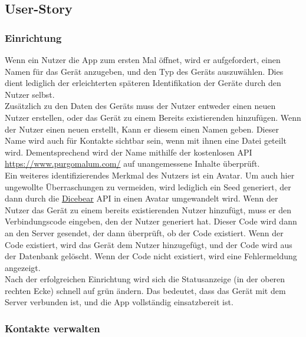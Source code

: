 \documentclass[a4paper]{article}
\begin{document}
\subsection{User-Story}

\subsubsection{Einrichtung}
Wenn ein Nutzer die App zum ersten Mal öffnet, wird er aufgefordert, einen Namen
für das Gerät anzugeben, und den Typ des Geräts auszuwählen. Dies dient
lediglich der erleichterten späteren Identifikation der Geräte durch den Nutzer
selbst.\\
Zusätzlich zu den Daten des Geräts muss der Nutzer entweder einen neuen Nutzer
erstellen, oder das Gerät zu einem Bereits existierenden hinzufügen. Wenn der
Nutzer einen neuen erstellt, Kann er diesem einen Namen geben. Dieser Name wird
auch für Kontakte sichtbar sein, wenn mit ihnen eine Datei geteilt wird.
Dementsprechend wird der Name mithilfe der kostenlosen API \url{
      https://www.purgomalum.com/} auf unangemessene Inhalte überprüft.\\
Ein weiteres identifizierendes Merkmal des Nutzers ist ein Avatar. Um auch hier
ungewollte Überraschungen zu vermeiden, wird lediglich ein Seed generiert, der
dann durch die \href{ https://www.dicebear.com/}{Dicebear} API in einen Avatar
umgewandelt wird. Wenn der Nutzer das Gerät zu einem bereits existierenden
Nutzer hinzufügt, muss er den Verbindungscode eingeben, den der Nutzer generiert
hat. Dieser Code wird dann an den Server gesendet, der dann überprüft, ob der
Code existiert. Wenn der Code existiert, wird das Gerät dem Nutzer hinzugefügt,
und der Code wird aus der Datenbank gelöscht. Wenn der Code nicht existiert,
wird eine Fehlermeldung angezeigt.\\
Nach der erfolgreichen Einrichtung wird sich die Statusanzeige (in der oberen
rechten Ecke) schnell auf grün ändern. Das bedeutet, dass das Gerät mit dem
Server verbunden ist, und die App vollständig einsatzbereit ist.

\subsubsection{Kontakte verwalten}
\end{document}
